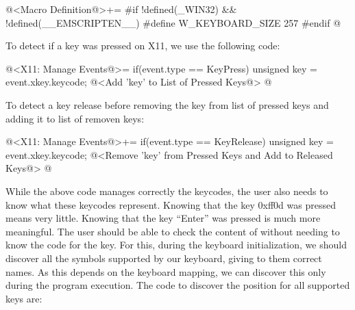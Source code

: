 \iniciocodigo
@<Macro Definition@>+=
#if !defined(_WIN32) && !defined(__EMSCRIPTEN__)
#define W_KEYBOARD_SIZE 257
#endif
@
\fimcodigo

To detect if a key was pressed on X11, we use the following code:

\iniciocodigo
@<X11: Manage Events@>=
if(event.type == KeyPress){
  unsigned key = event.xkey.keycode;
  @<Add 'key' to List of Pressed Keys@>
}
@
\fimcodigo

To detect a key release before removing the key from list of pressed
keys and adding it to list of removen keys:

\iniciocodigo
@<X11: Manage Events@>+=
if(event.type == KeyRelease){
  unsigned key = event.xkey.keycode;
  @<Remove 'key' from Pressed Keys and Add to Released Keys@>
}
@
\fimcodigo

While the above code manages correctly the keycodes, the user also
needs to know what these keycodes represent. Knowing that the key
0xff0d was pressed means very little. Knowing that the key ``Enter''
was pressed is much more meaningful. The user should be able to check
the content of  without needing
to know the code for the key. For this, during the keyboard
initialization, we should discover all the symbols supported by our
keyboard, giving to them correct names. As this depends on the
keyboard mapping, we can discover this only during the program
execution. The code to discover the position for all supported keys
are:

